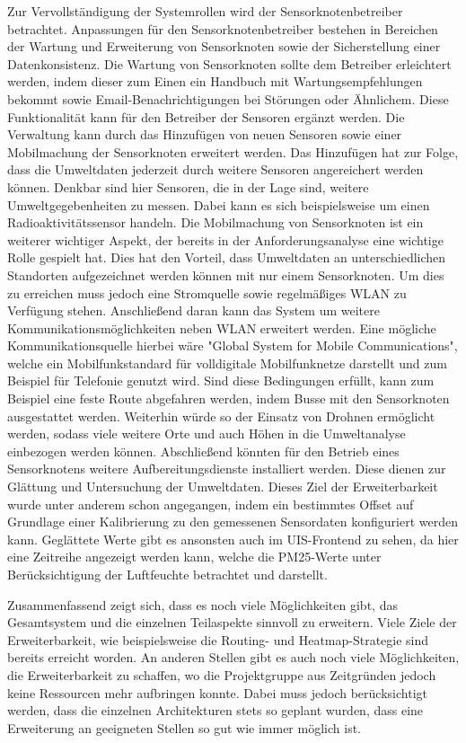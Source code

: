 Zur Vervollständigung der Systemrollen wird der Sensorknotenbetreiber betrachtet. 
Anpassungen für den Sensorknotenbetreiber bestehen in Bereichen der Wartung und Erweiterung von Sensorknoten sowie der Sicherstellung einer Datenkonsistenz. 
Die Wartung von Sensorknoten sollte dem Betreiber erleichtert werden, indem dieser zum Einen ein Handbuch mit Wartungsempfehlungen bekommt sowie Email-Benachrichtigungen bei Störungen oder Ähnlichem. 
Diese Funktionalität kann für den Betreiber der Sensoren ergänzt werden.
Die Verwaltung kann durch das Hinzufügen von neuen Sensoren sowie einer Mobilmachung der Sensorknoten erweitert werden. 
Das Hinzufügen hat zur Folge, dass die Umweltdaten jederzeit durch weitere Sensoren angereichert werden können. 
Denkbar sind hier Sensoren, die in der Lage sind, weitere Umweltgegebenheiten zu messen. Dabei kann es sich beispielsweise um einen Radioaktivitätssensor handeln.
Die Mobilmachung von Sensorknoten ist ein weiterer wichtiger Aspekt, der bereits in der Anforderungsanalyse eine wichtige Rolle gespielt hat. 
Dies hat den Vorteil, dass Umweltdaten an unterschiedlichen Standorten aufgezeichnet werden können mit nur einem Sensorknoten. 
Um dies zu erreichen muss jedoch eine Stromquelle sowie regelmäßiges WLAN zu Verfügung stehen.
Anschließend daran kann das System um weitere Kommunikationsmöglichkeiten neben WLAN erweitert werden. 
Eine mögliche Kommunikationsquelle hierbei wäre "Global System for Mobile Communications", welche ein Mobilfunkstandard für volldigitale Mobilfunknetze darstellt und zum Beispiel für Telefonie genutzt wird.
Sind diese Bedingungen erfüllt, kann zum Beispiel eine feste Route abgefahren werden, indem Busse mit den Sensorknoten ausgestattet werden. 
Weiterhin würde so der Einsatz von Drohnen ermöglicht werden, sodass viele weitere Orte und auch Höhen in die Umweltanalyse einbezogen werden können.
Abschließend könnten für den Betrieb eines Sensorknotens weitere Aufbereitungsdienste installiert werden. 
Diese dienen zur Glättung und Untersuchung der Umweltdaten. 
Dieses Ziel der Erweiterbarkeit wurde unter anderem schon angegangen, indem ein bestimmtes Offset auf Grundlage einer Kalibrierung zu den gemessenen Sensordaten konfiguriert werden kann.
Geglättete Werte gibt es ansonsten auch im UIS-Frontend zu sehen, da hier eine Zeitreihe angezeigt werden kann, welche die PM25-Werte unter Berücksichtigung der Luftfeuchte betrachtet und darstellt.


Zusammenfassend zeigt sich, dass es noch viele Möglichkeiten gibt, das Gesamtsystem und die einzelnen Teilaspekte sinnvoll zu erweitern. Viele Ziele der Erweiterbarkeit, wie beispielsweise die Routing- und Heatmap-Strategie sind bereits erreicht worden. 
An anderen Stellen gibt es auch noch viele Möglichkeiten, die Erweiterbarkeit zu schaffen, wo die Projektgruppe aus Zeitgründen jedoch keine Ressourcen mehr aufbringen konnte. 
Dabei muss jedoch berücksichtigt werden, dass die einzelnen Architekturen stets so geplant wurden, dass eine Erweiterung an geeigneten Stellen so gut wie immer möglich ist.
